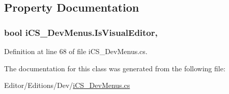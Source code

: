 \subsection{Property Documentation}
\hypertarget{classi_c_s___dev_menus_a457781cf841cb0c9cbfc5802c10ef8d5}{
\subsubsection[{Is\+Visual\+Editor}]{\setlength{\rightskip}{0pt plus 5cm}bool i\+C\+S\+\_\+\+Dev\+Menus.\+Is\+Visual\+Editor\hspace{0.3cm}{\ttfamily [static]}, {\ttfamily [get]}}}\label{classi_c_s___dev_menus_a457781cf841cb0c9cbfc5802c10ef8d5}


Definition at line 68 of file i\+C\+S\+\_\+\+Dev\+Menus.\+cs.



The documentation for this class was generated from the following file\+:\begin{DoxyCompactItemize}
\item 
Editor/\+Editions/\+Dev/\hyperlink{i_c_s___dev_menus_8cs}{i\+C\+S\+\_\+\+Dev\+Menus.\+cs}\end{DoxyCompactItemize}
